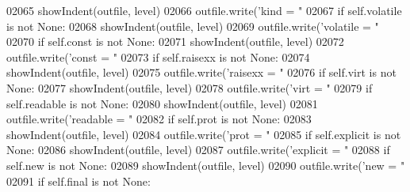 \begin{DoxyCode}
{{{{{{{{{{{{{{{{{{{{{{{{{{{{{{{{{{{{{{{{{{{{{{{{{{{{{{{{{{{{{{{{{{{{{{{{{{{{{{{{{{{{{{{{{{{{{{{{{{{{{{{{{{{{{{{{{{{{{{{{{{{{{{{{{{{{{{{{{{{{{{{{02065             showIndent(outfile, level)
02066             outfile.write(\textcolor{stringliteral}{'kind = "%
02067         \textcolor{keywordflow}{if} self.volatile \textcolor{keywordflow}{is} \textcolor{keywordflow}{not} \textcolor{keywordtype}{None}:
02068             showIndent(outfile, level)
02069             outfile.write(\textcolor{stringliteral}{'volatile = "%
02070         \textcolor{keywordflow}{if} self.const \textcolor{keywordflow}{is} \textcolor{keywordflow}{not} \textcolor{keywordtype}{None}:
02071             showIndent(outfile, level)
02072             outfile.write(\textcolor{stringliteral}{'const = "%
02073         \textcolor{keywordflow}{if} self.raisexx \textcolor{keywordflow}{is} \textcolor{keywordflow}{not} \textcolor{keywordtype}{None}:
02074             showIndent(outfile, level)
02075             outfile.write(\textcolor{stringliteral}{'raisexx = "%
02076         \textcolor{keywordflow}{if} self.virt \textcolor{keywordflow}{is} \textcolor{keywordflow}{not} \textcolor{keywordtype}{None}:
02077             showIndent(outfile, level)
02078             outfile.write(\textcolor{stringliteral}{'virt = "%
02079         \textcolor{keywordflow}{if} self.readable \textcolor{keywordflow}{is} \textcolor{keywordflow}{not} \textcolor{keywordtype}{None}:
02080             showIndent(outfile, level)
02081             outfile.write(\textcolor{stringliteral}{'readable = "%
02082         \textcolor{keywordflow}{if} self.prot \textcolor{keywordflow}{is} \textcolor{keywordflow}{not} \textcolor{keywordtype}{None}:
02083             showIndent(outfile, level)
02084             outfile.write(\textcolor{stringliteral}{'prot = "%
02085         \textcolor{keywordflow}{if} self.explicit \textcolor{keywordflow}{is} \textcolor{keywordflow}{not} \textcolor{keywordtype}{None}:
02086             showIndent(outfile, level)
02087             outfile.write(\textcolor{stringliteral}{'explicit = "%
02088         \textcolor{keywordflow}{if} self.new \textcolor{keywordflow}{is} \textcolor{keywordflow}{not} \textcolor{keywordtype}{None}:
02089             showIndent(outfile, level)
02090             outfile.write(\textcolor{stringliteral}{'new = "%
02091         \textcolor{keywordflow}{if} self.final \textcolor{keywordflow}{is} \textcolor{keywordflow}{not} \textcolor{keywordtype}{None}:
}}}}}}}}}}}}}}}}}}}}}}}}}}}}}}}}}}}}}}}}}}}}}}}}}}}}}}}}}}}}}}}}}}}}}}}}}}}}}}}}}}}}}}}}}}}}}}}}}}}}}}}}}}}}}}}}}}}}}}}}}}}}}}}}}}}}}}}}}}}}}}}}}}}}}}}}}
\end{DoxyCode}
